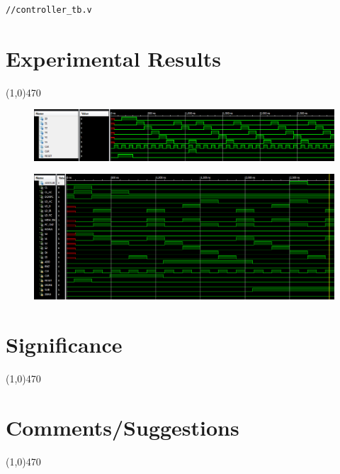 \documentclass[12pt]{article}
\begin{document}
		\begin{Verbatim}[frame=single, fontsize= \small]
//controller_tb.v
		\end{Verbatim}
		
			
\section{Experimental Results}\vspace{-.7cm} \line(1,0){470}

\begin{figure}[h]
    \centering
	\includegraphics[scale=.48]{control_tb.png}
	\caption{}
\end{figure}

\begin{figure}[h]
    \centering
	\includegraphics[scale=.48]{controller_tb.png}
	\caption{}
\end{figure}


	\newpage
\section{Significance} \vspace{-.7cm} \line(1,0){470}
	\paragraph{}


 \section{Comments/Suggestions}\vspace{-.7cm} \line(1,0){470}
 	\paragraph{}
		
\end{document}
